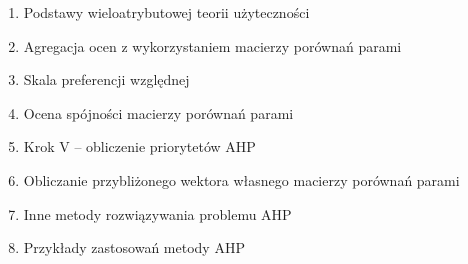 \documentclass[11pt]{article}
\begin{document}
\begin{enumerate}
        \item Podstawy wieloatrybutowej teorii użyteczności
        \item Agregacja ocen z wykorzystaniem macierzy porównań parami
        \item Skala preferencji względnej
        \item Ocena spójności macierzy porównań parami
        \item Krok V – obliczenie priorytetów AHP
        \item Obliczanie przybliżonego wektora własnego macierzy porównań parami
        \item Inne metody rozwiązywania problemu AHP
        \item Przykłady zastosowań metody AHP
    \end{enumerate}
\end{document}
